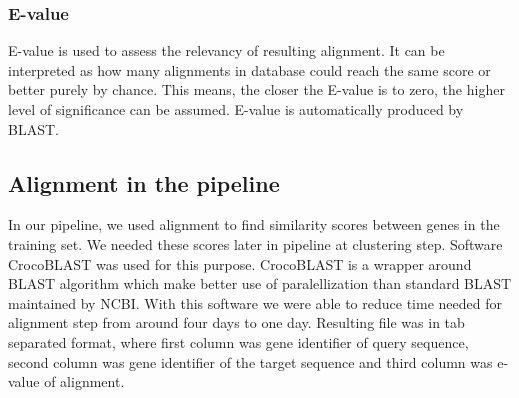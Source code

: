\subsubsection{E-value}
E-value is used to assess the relevancy of resulting alignment.
It can be interpreted as how many alignments in database could reach the same score or better purely by chance.
This means, the closer the E-value is to zero, the higher level of significance can be assumed.
E-value is automatically produced by BLAST. 

\subsection{Alignment in the pipeline}
In our pipeline, we used alignment to find similarity scores between genes in the training set.
We needed these scores later in pipeline at clustering step.
Software CrocoBLAST was used for this purpose.
CrocoBLAST is a wrapper around BLAST algorithm which make better use of paralellization than standard BLAST maintained by NCBI.
With this software we were able to reduce time needed for alignment step from around four days to one day. 
Resulting file was in tab separated format, where first column was gene identifier of query sequence, second column was gene identifier of the target sequence and third column was e-value of alignment. 
